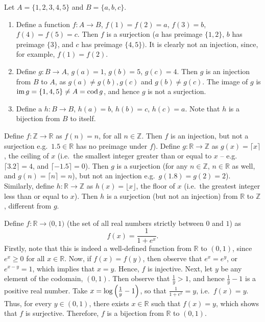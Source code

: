 \begin{Example}
Let $A = \{1, 2, 3, 4, 5\}$ and $B = \{a, b, c\}$.
\begin{enumerate}
\item Define a function $f \colon A \to B$, $f(1) = f(2) = a$, $f(3) = b$, $f(4) = f(5) = c$. Then $f$ is a surjection ($a$ has preimage $\{1, 2\}$, $b$ has preimage $\{3\}$, and $c$ has preimage $\{4, 5\})$. It is clearly not an injection, since, for example, $f(1) = f(2)$.

\item Define $g \colon B \to A$, $g(a) = 1$, $g(b) = 5$, $g(c) = 4$. Then $g$ is an injection from $B$ to $A$, as $g(a) \ne g(b), g(c)$ and $g(b) \ne g(c)$. The image of $g$ is $\operatorname{im} g = \{1, 4, 5\} \ne A = \operatorname{cod} g$, and hence $g$ is not a surjection.

\item Define a $h \colon B \to B$, $h(a) = b$, $h(b) = c$, $h(c) = a$. Note that $h$ is a bijection from $B$ to itself.
\end{enumerate}
\end{Example}

\begin{Example}
Define $f \colon \mathbb Z \to \mathbb R$ as $f(n) = n$, for all $n \in \mathbb Z$. Then $f$ is an injection, but not a surjection e.g.\ $1.5 \in \mathbb R$ has no preimage under $f$). Define $g \colon \mathbb R \to \mathbb Z$ as $g(x) = \lceil x \rceil$, the ceiling of $x$ (i.e.\ the smallest integer greater than or equal to $x$ -- e.g.\ $\lceil 3.2 \rceil = 4$, and $\lceil -1.5 \rceil = 0$). Then $g$ is a surjection (for any $n \in \mathbb Z$, $n \in \mathbb R$ as well, and $g(n) = \lceil n \rceil = n$), but not an injection e.g.\ $g(1.8) = g(2) = 2$). Similarly, define $h \colon \mathbb R \to \mathbb Z$ as $h(x) = \lfloor x \rfloor$, the floor of $x$ (i.e.\ the greatest integer less than or equal to $x$). Then $h$ is a surjection (but not an injection) from $\mathbb R$ to $\mathbb Z$, different from $g$.
\end{Example}

\begin{Example}\label{ex:RIsom01}
Define $f \colon \mathbb R \to \mathbb (0,1)$ (the set of all real numbers strictly between $0$ and $1$) as
\begin{equation*}
f(x) = \dfrac{1}{1 + e^x}.
\end{equation*}
Firstly, note that this is indeed a well-defined function from $\mathbb R$ to $(0, 1)$, since $e^x \ge 0$ for all $x \in \mathbb R$. Now, if $f(x) = f(y)$, then observe that $e^x = e^y$, or $e^{x - y} = 1$, which implies that $x = y$. Hence, $f$ is injective. Next, let $y$ be any element of the codomain, $(0, 1)$. Then observe that $\frac 1 y > 1$, and hence $\frac 1 y - 1$ is a positive real number. Take $x = \log\pqty{\frac 1 y - 1}$, so that $\frac 1 {1 + e^x} = y$, i.e.\ $f(x) = y$. Thus, for every $y \in (0, 1)$, there exists $x \in \mathbb R$ such that $f(x) = y$, which shows that $f$ is surjective. Therefore, $f$ is a bijection from $\mathbb R$ to $(0, 1)$.
\end{Example}

